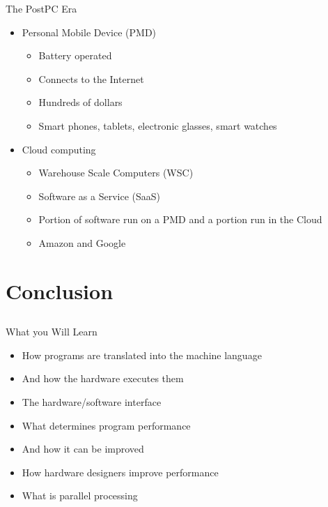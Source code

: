 \documentclass{beamer}
\begin{document}
\begin{frame}{The PostPC Era}
\begin{itemize}
\item Personal Mobile Device (PMD)
\begin{itemize}
\item Battery operated
\item Connects to the Internet
\item Hundreds of dollars
\item Smart phones, tablets, electronic glasses, smart watches
\end{itemize}
\item Cloud computing
\begin{itemize}
\item Warehouse Scale Computers (WSC)
\item Software as a Service (SaaS)
\item Portion of software run on a PMD and a portion run in the Cloud
\item Amazon and Google
\end{itemize}
\end{itemize}
\end{frame}

\section{Conclusion}
\subsection{}
\begin{frame}{What you Will Learn}
\begin{itemize}
\item How programs are translated into the machine language
\item And how the hardware executes them
\item The hardware/software interface
\item What determines program performance
\item And how it can be improved
\item How hardware designers improve performance
\item What is parallel processing
\end{itemize}
\end{frame}
\end{document}
